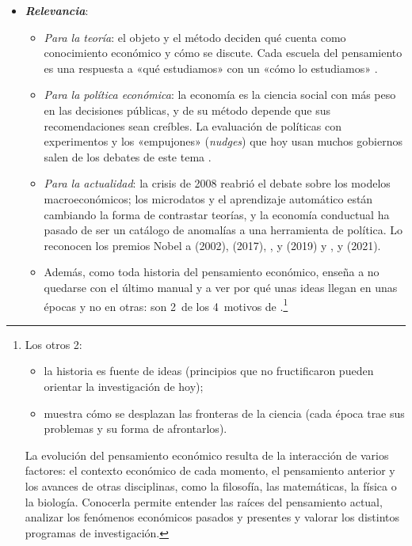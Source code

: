 \documentclass[11pt]{article}
\begin{document}
\begin{itemize}
\item \textbf{\emph{Relevancia}}:
  \begin{itemize}
  \item \emph{Para la teoría}: el objeto y el método deciden qué cuenta como conocimiento económico y cómo se discute. Cada escuela del pensamiento es una respuesta a «qué estudiamos» con un «cómo lo estudiamos»  .
  \item \emph{Para la política económica}: la economía es la ciencia social con más peso en las decisiones públicas, y de su método depende que sus recomendaciones sean creíbles. La evaluación de políticas con experimentos y los «empujones» (\emph{nudges}) que hoy usan muchos gobiernos salen de los debates de este tema .
  \item \emph{Para la actualidad}: la crisis de 2008 reabrió el debate sobre los modelos macroeconómicos; los microdatos y el aprendizaje automático están cambiando la forma de contrastar teorías, y la economía conductual ha pasado de ser un catálogo de anomalías a una herramienta de política. Lo reconocen los premios Nobel a  (2002),  (2017), ,  y  (2019) y ,  y  (2021)\nocite{Nobel2002Kahneman,Nobel2017Thaler,NobelPrize2019,Nobel2021CardAngristImbens}.
  \item Además, como toda historia del pensamiento económico, enseña a no quedarse con el último manual y a ver por qué unas ideas llegan en unas épocas y no en otras: son 2~de los 4~motivos de \textcite{Schumpeter1954History}.\footnote{Los otros 2:
\begin{itemize}
\item la historia es fuente de ideas (principios que no fructificaron pueden orientar la investigación de hoy);
\item muestra cómo se desplazan las fronteras de la ciencia (cada época trae sus problemas y su forma de afrontarlos).
\end{itemize}
La evolución del pensamiento económico resulta de la interacción de varios factores: el contexto económico de cada momento, el pensamiento anterior y los avances de otras disciplinas, como la filosofía, las matemáticas, la física o la biología. Conocerla permite entender las raíces del pensamiento actual, analizar los fenómenos económicos pasados y presentes y valorar los distintos programas de investigación.}
  \end{itemize}


\end{itemize}
\end{document}
